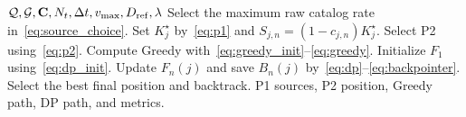 \begin{algorithm}[t]
\caption{Source Search and Offline UAV Positioning}
\label{alg:optimization}
\begin{algorithmic}[1]
\Require $\mathcal Q,\mathcal G,\mathbf C,N_t,\Delta t,v_{\max},D_{\rm ref},\lambda$
 \State Select the maximum raw catalog rate in~\eqref{eq:source_choice}.
 \State Set $K_j^\star$ by~\eqref{eq:p1} and $S_{j,n}=(1-c_{j,n})K_j^\star$.
\EndFor
\State Select P2 using~\eqref{eq:p2}.
\State Compute Greedy with~\eqref{eq:greedy_init}--\eqref{eq:greedy}.
\State Initialize $F_1$ using~\eqref{eq:dp_init}.
  \State Update $F_n(j)$ and save $B_n(j)$ by~\eqref{eq:dp}--\eqref{eq:backpointer}.
 \EndFor
\EndFor
\State Select the best final position and backtrack.
\Ensure P1 sources, P2 position, Greedy path, DP path, and metrics.
\end{algorithmic}
\end{algorithm}
